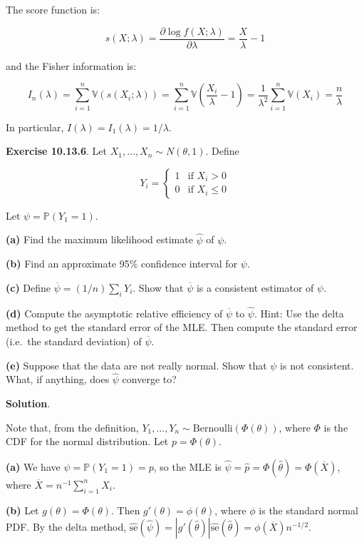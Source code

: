 The score function is:

\[ s(X; \lambda) = \frac{\partial \log f(X; \lambda)}{\partial \lambda} = \frac{X}{\lambda} - 1\]

and the Fisher information is:

\[ I_{n}(\lambda) = \sum_{i=1}^{n} \mathbb{V}\left( s(X_{i}; \lambda) \right) 
= \sum_{i=1}^{n} \mathbb{V} \left( \frac{X_{i}}{\lambda} - 1 \right)
= \frac{1}{\lambda^{2}}  \sum_{i=1}^{n} \mathbb{V}(X_{i}) = \frac{n}{\lambda}\]

In particular, \(I(\lambda) = I_{1}(\lambda) = 1 / \lambda\).

\textbf{Exercise 10.13.6}. Let \(X_{1}, \dots, X_{n} \sim N(\theta, 1)\).
Define

\[Y_{i} = \begin{cases}
1 & \text{if } X_{i} > 0 \\
0 & \text{if } X_{i} \leq 0
\end{cases}\]

Let \(\psi = \mathbb{P}(Y_{1} = 1)\).

\textbf{(a)} Find the maximum likelihood estimate \(\hat{\psi}\) of
\(\psi\).

\textbf{(b)} Find an approximate 95\% confidence interval for \(\psi\).

\textbf{(c)} Define \(\overline{\psi} = (1 / n) \sum_{i} Y_{i}\). Show that
\(\overline{\psi}\) is a consistent estimator of \(\psi\).

\textbf{(d)} Compute the asymptotic relative efficiency of
\(\overline{\psi}\) to \(\hat{\psi}\). Hint: Use the delta method to get
the standard error of the MLE. Then compute the standard error (i.e.~the
standard deviation) of \(\overline{\psi}\).

\textbf{(e)} Suppose that the data are not really normal. Show that
\(\psi\) is not consistent. What, if anything, does \(\hat{\psi}\)
converge to?

\textbf{Solution}.

Note that, from the definition,
\(Y_{1}, \dots, Y_{n} \sim \text{Bernoulli}(\Phi(\theta))\), where \(\Phi\)
is the CDF for the normal distribution. Let \(p = \Phi(\theta)\).

\textbf{(a)} We have \(\psi = \mathbb{P}(Y_{1} = 1) = p\), so the MLE is
\(\hat{\psi} = \hat{p} = \Phi(\hat{\theta})
= \Phi(\overline{X})\), where
\(\overline{X} = n^{-1} \sum_{i=1}^{n} X_{i}\).

\textbf{(b)} Let \(g(\theta) = \Phi(\theta)\). Then
\(g'(\theta) = \phi(\theta)\), where \(\phi\) is the standard normal
PDF. By the delta method,
\(\hat{\text{se}}(\hat{\psi}) = |g'(\hat{\theta})| \hat{\text{se}}(\hat{\theta}) = \phi(\overline{X}) n^{-1/2}\).

